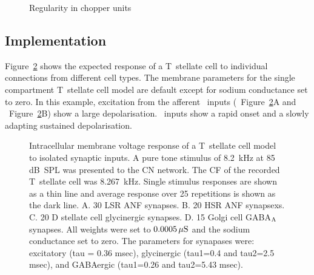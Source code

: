 \begin{figure}[htb]
  \centering
  \caption{Regularity in chopper units \citep[Data reproduced from Fig.~2,~][]{PaoliniClareyEtAl:2005}}
  \label{fig:PaoliniCVdata}
\end{figure}





\subsection{Implementation}






Figure~\ref{fig:TSinputs} shows the expected response of a T~stellate cell to
individual connections from different cell types. The membrane parameters for
the single compartment T~stellate cell model are default except for sodium
conductance set to zero. In this example, excitation from the afferent
\ANF~inputs (\LSR~Figure~\ref{fig:TSinputs}A and
\HSR~Figure~\ref{fig:TSinputs}B) show a large depolarisation.  \HSR~inputs show
a rapid onset and a slowly adapting sustained depolarisation.




\begin{figure}[htb]
  \centering
  \caption[Response of T~stellate cells to isolated synaptic
  inputs]{Intracellular membrane voltage response of a T~stellate cell model to
    isolated synaptic inputs. A pure tone stimulus of 8.2~kHz at 85 dB~SPL was
    presented to the CN network. The CF of the recorded T~stellate cell was
    8.267~kHz.  Single stimulus responses are shown as a thin line and average
    response over 25 repetitions is shown as the dark line. A. 30 LSR ANF
    synapses. B. 20 HSR ANF synapsexs. C. 20 D stellate cell glycinergic
    synapses. D. 15 Golgi cell GABA$_{\rm A}$ synapses. All weights were set to
    $0.0005\,\mu{\rm S}$ and the sodium conductance set to zero.  The parameters
    for synapases were: excitatory (tau = 0.36 msec), glycinergic (tau1=0.4 and
    tau2=2.5 msec), and GABAergic (tau1=0.26 and tau2=5.43
    msec).\label{fig:TSinputs}}
\end{figure}

